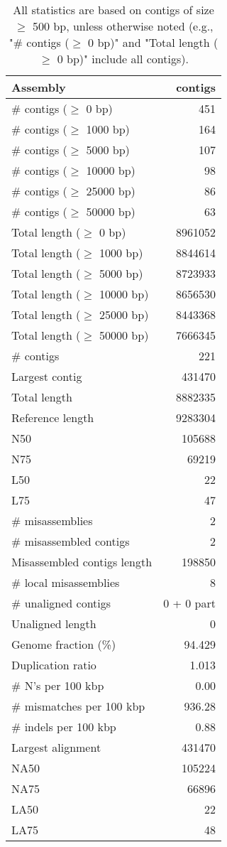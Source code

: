 \documentclass[12pt,a4paper]{article}
\begin{document}
\begin{table}[ht]
\begin{center}
\caption{All statistics are based on contigs of size $\geq$ 500 bp, unless otherwise noted (e.g., "\# contigs ($\geq$ 0 bp)" and "Total length ($\geq$ 0 bp)" include all contigs).}
\begin{tabular}{|l*{1}{|r}|}
\hline
Assembly & contigs \\ \hline
\# contigs ($\geq$ 0 bp) & 451 \\ \hline
\# contigs ($\geq$ 1000 bp) & 164 \\ \hline
\# contigs ($\geq$ 5000 bp) & 107 \\ \hline
\# contigs ($\geq$ 10000 bp) & 98 \\ \hline
\# contigs ($\geq$ 25000 bp) & 86 \\ \hline
\# contigs ($\geq$ 50000 bp) & 63 \\ \hline
Total length ($\geq$ 0 bp) & 8961052 \\ \hline
Total length ($\geq$ 1000 bp) & 8844614 \\ \hline
Total length ($\geq$ 5000 bp) & 8723933 \\ \hline
Total length ($\geq$ 10000 bp) & 8656530 \\ \hline
Total length ($\geq$ 25000 bp) & 8443368 \\ \hline
Total length ($\geq$ 50000 bp) & 7666345 \\ \hline
\# contigs & 221 \\ \hline
Largest contig & 431470 \\ \hline
Total length & 8882335 \\ \hline
Reference length & 9283304 \\ \hline
N50 & 105688 \\ \hline
N75 & 69219 \\ \hline
L50 & 22 \\ \hline
L75 & 47 \\ \hline
\# misassemblies & 2 \\ \hline
\# misassembled contigs & 2 \\ \hline
Misassembled contigs length & 198850 \\ \hline
\# local misassemblies & 8 \\ \hline
\# unaligned contigs & 0 + 0 part \\ \hline
Unaligned length & 0 \\ \hline
Genome fraction (\%) & 94.429 \\ \hline
Duplication ratio & 1.013 \\ \hline
\# N's per 100 kbp & 0.00 \\ \hline
\# mismatches per 100 kbp & 936.28 \\ \hline
\# indels per 100 kbp & 0.88 \\ \hline
Largest alignment & 431470 \\ \hline
NA50 & 105224 \\ \hline
NA75 & 66896 \\ \hline
LA50 & 22 \\ \hline
LA75 & 48 \\ \hline
\end{tabular}
\end{center}
\end{table}
\end{document}
